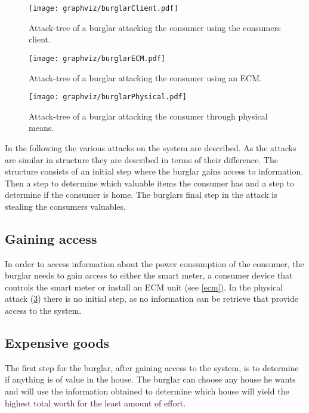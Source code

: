 \begin{figure}
\center
\texttt{[image: graphviz/burglarClient.pdf]}
\caption{Attack-tree of a burglar attacking the consumer using the consumers client.}
\label{attacktree:burglar:client}
\end{figure}

\begin{figure}
\center
\texttt{[image: graphviz/burglarECM.pdf]}
\caption{Attack-tree of a burglar attacking the consumer using an ECM.}
\label{attacktree:burglar:ecm}
\end{figure}

\begin{figure}
\center
\texttt{[image: graphviz/burglarPhysical.pdf]}
\caption{Attack-tree of a burglar attacking the consumer through physical means.}
\label{attacktree:burglar:physical}
\end{figure}

In the following the various attacks on the system are described.
As the attacks are similar in structure they are described in terms of their difference.
The structure consists of an initial step where the burglar gains access to information.
Then a step to determine which valuable items the consumer has and a step to determine if the consumer is home.
The burglars final step in the attack is stealing the consumers valuables.

\subsection{Gaining access}
In order to access information about the power consumption of the consumer, the burglar needs to gain access to either the smart meter, a consumer device that controls the smart meter or install an ECM unit (see \cref{ecm}).
In the physical attack (\cref{attacktree:burglar:physical}) there is no initial step, as no information can be retrieve that provide access to the system.

\subsection{Expensive goods}
The first step for the burglar, after gaining access to the system, is to determine if anything is of value in the house. 
The burglar can choose any house he wants and will use the information obtained to determine which house will yield the highest total worth for the least amount of effort.

